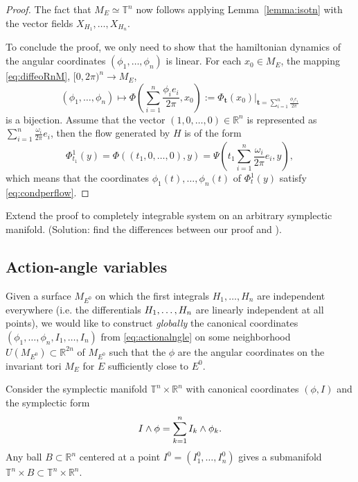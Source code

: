 \documentclass[english,fontsize=11pt,paper=a5,oneside]{scrbook}
\newcommand{\R}{\mathbb{R}}
\newcommand{\T}{\mathbb{T}}
\let\d\relax
\DeclareMathOperator{\d}{d}
\theoremstyle{definition}
\newenvironment{exercise}
  {\pushQED{\qed}\renewcommand{\qedsymbol}{$\maltese$}\exercisex}
  {\popQED\endexercisex}
\begin{document}
\begin{proof}
    The fact that $M_E\simeq \T^n$ now follows applying Lemma~\ref{lemma:isotn} with the vector fields $X_{H_1}, \ldots, X_{H_n}$.

    To conclude the proof, we only need to show that the hamiltonian dynamics of the angular coordinates $(\phi_1, \ldots, \phi_n)$ is linear.
    For each $x_0\in M_E$, the mapping \eqref{eq:diffeoRnM}, $[0, 2\pi)^n \to M_E$, 
    \begin{equation}
        (\phi_1, \ldots, \phi_n)\mapsto \Phi\left(\sum_{i=1}^n \frac{\phi_i e_i}{2\pi}, x_0\right) := \Phi_{\bm t}(x_0)\Big|_{\bm t = \sum_{i=1}^n \frac{\phi_i e_i}{2\pi}}
    \end{equation}
    is a bijection.
    Assume that the vector $(1, 0, \ldots, 0)\in\R^n$ is represented as $\sum_{i=1}^n \frac{\omega_i}{2\pi} e_i$, then the flow generated by $H$ is of the form
    \begin{equation}
        \Phi^1_{t_1}(y) = \Phi((t_1, 0, \ldots, 0), y)
        = \Psi\left(t_1 \sum_{i=1}^n \frac{\omega_i}{2\pi}e_i, y\right),
    \end{equation}
    which means that the coordinates $\phi_1(t), \ldots, \phi_n(t)$ of $\Phi_t^1(y)$ satisfy \eqref{eq:condperflow}.
\end{proof}

\begin{exercise}
    Extend the proof to completely integrable system on an arbitrary symplectic manifold. (Solution: find the differences between our proof and \cite[Theorem 13.3]{book:knauf}).
\end{exercise}

\subsection{Action-angle variables}

Given a surface $M_{E^0}$ on which the first integrals $H_1, \ldots, H_n$ are independent everywhere (i.e. the differentials $\d H_1, \ldots, \d H_n$ are linearly independent at all points), we would like to construct \emph{globally} the canonical coordinates $(\phi_1, \ldots, \phi_n, I_1, \ldots, I_n)$ from \eqref{eq:actionalngle} on some neighborhood $U(M_{E^0})\subset \R^{2n}$ of $M_{E^0}$ such that the $\phi$ are the angular coordinates on the invariant tori $M_E$ for $E$ sufficiently close to $E^0$.

Consider the symplectic manifold $\T^n \times \R^n$ with canonical coordinates $(\phi, I)$ and the symplectic form
\begin{equation}
    \d I \wedge \d \phi = \sum_{k=1}^n \d I_k \wedge \d \phi_k.
\end{equation}
Any ball $B\subset\R^n$ centered at a point $I^0 = (I^0_1, \ldots, I^0_n)$ gives a submanifold $\T^n\times B \subset \T^n \times \R^n$.
\end{document}
